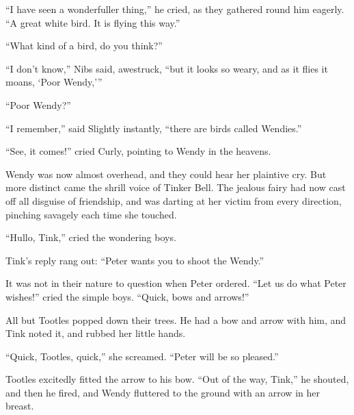 “I have seen a wonderfuller thing,” he cried, as they gathered round him eagerly.
“A great white bird.
It is flying this way.”

“What kind of a bird, do you think?”

“I don’t know,” Nibs said, awestruck,
“but it looks so weary, and as it flies it moans, ‘Poor Wendy,’”

“Poor Wendy?”

“I remember,” said Slightly instantly, “there are birds called Wendies.”

“See, it comes!\@” cried Curly, pointing to Wendy in the heavens.

Wendy was now almost overhead, and they could hear her plaintive cry.
But more distinct came the shrill voice of Tinker Bell.
The jealous fairy had now cast off all disguise of friendship,
and was darting at her victim from every direction, pinching savagely each time she touched.

“Hullo, Tink,” cried the wondering boys.

Tink’s reply rang out:
“Peter wants you to shoot the Wendy.”

It was not in their nature to question when Peter ordered.
“Let us do what Peter wishes!\@” cried the simple boys.
“Quick, bows and arrows!”

All but Tootles popped down their trees.
He had a bow and arrow with him,
and Tink noted it, and rubbed her little hands.

“Quick, Tootles, quick,” she screamed.
“Peter will be so pleased.”

Tootles excitedly fitted the arrow to his bow.
“Out of the way, Tink,” he shouted, and then he fired,
and Wendy fluttered to the ground with an arrow in her breast.

\endinput
